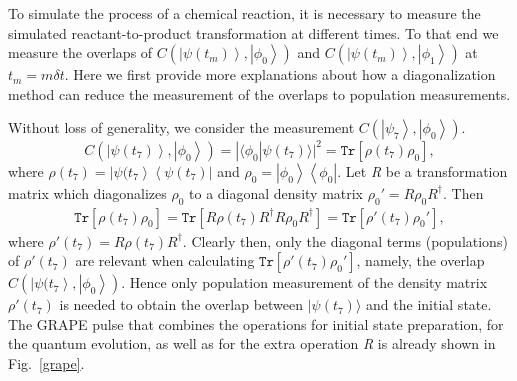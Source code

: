 \documentclass[twocolumn,showpacs,twoside,10pt,prl]{revtex4}
\newcommand{\la}{\langle}
\newcommand{\ra}{\rangle}
\begin{document}
To simulate the process of a chemical reaction, it is necessary to measure the simulated reactant-to-product transformation at different times. To that end we measure the overlaps of $C(\left\vert \psi({t_m}) \right\rangle,\left\vert \phi_{0} \right\rangle)$ and $C(\left\vert \psi(t_{m}) \right\rangle,\left\vert \phi_{1} \right\rangle)$ at $t_m=m\delta t$.
Here we first provide more explanations about how a diagonalization method can reduce the measurement of the overlaps to population measurements.


Without loss of generality, we consider the measurement $C(\left\vert \psi_{7} \right\rangle,\left\vert \phi_{0} \right\rangle)$.
\begin{equation}\label{overlap7}
C(\left\vert \psi(t_{7}) \right\rangle,\left\vert \phi_{0} \right\rangle)=| \la\phi_0|\psi(t_7)\ra |^2=\texttt{Tr}[\rho(t_7) \rho_0],
\end{equation}
where $\rho(t_7)=\left\vert \psi(t_{7} \right\rangle\left\langle \psi(t_{7}) \right\vert$ and $\rho_0=\left\vert \phi_{0} \right\rangle\left\langle \phi_{0} \right\vert$. Let \emph{R} be a transformation matrix which diagonalizes $\rho_0$ to a diagonal density matrix $\rho_0'=R \rho_0R^{\dagger}$. Then
\begin{eqnarray}\label{diag}
\texttt{Tr}[\rho(t_7) \rho_0]=\texttt{Tr}[R\rho(t_7) R^{\dagger}R \rho_0R^{\dagger}]=\texttt{Tr}[\rho'(t_7) \rho_0'],
\end{eqnarray}
where $\rho'(t_7)=R \rho(t_7)R^{\dagger}$.
Clearly then, only the diagonal terms (populations) of $\rho'(t_7)$ are relevant when calculating $\texttt{Tr}[\rho'(t_7) \rho_0']$,
namely, the overlap $C(\left\vert \psi(t_{7} \right\rangle,\left\vert \phi_{0} \right\rangle)$. Hence only population measurement of the  density matrix $\rho'(t_7)$ is needed to obtain the overlap between $|\psi(t_7)\rangle$ and the initial state.
The GRAPE pulse that combines the operations for initial state preparation, for the quantum evolution, as well as for the extra operation \emph{R} is already shown in Fig.~\ref{grape}.
\end{document}
